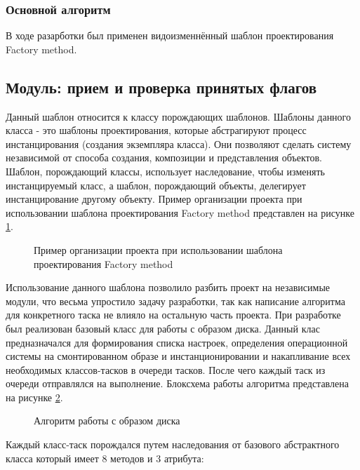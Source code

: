 \subsubsection{Основной алгоритм}
В ходе разарботки был применен видоизменнённый шаблон проектирования Factory method.


\newpage
\subsection{Модуль: прием и проверка принятых флагов} %


Данный шаблон относится к классу порождающих шаблонов. Шаблоны данного класса - это шаблоны проектирования, которые абстрагируют процесс инстанцирования (создания экземпляра класса). Они позволяют сделать систему независимой от способа создания, композиции и представления объектов. Шаблон, порождающий классы, использует наследование, чтобы изменять инстанцируемый класс, а шаблон, порождающий объекты, делегирует инстанцирование другому объекту.
Пример организации проекта при использовании шаблона проектирования Factory method представлен на рисунке \ref{architech:architech}.

\begin{figure}[h!]
\caption{Пример организации проекта при использовании шаблона проектирования Factory method}
\label{architech:architech}
\end{figure}

Использование данного шаблона позволило разбить проект на независимые модули, что весьма упростило задачу разработки, так как написание алгоритма для конкретного таска не влияло на остальную часть проекта. При разработке был реализован базовый класс для работы с образом диска. Данный клас предназначался для формирования списка настроек, определения операционной системы на смонтированном образе и инстанционировании и накапливание всех необходимых классов-тасков в очереди тасков. После чего каждый таск из очереди отправлялся на выполнение. Блоксхема работы алгоритма представлена на рисунке \ref{alg_main:alg_main}.

\begin{figure}[h!]
\caption{Алгоритм работы с образом диска}
\label{alg_main:alg_main}
\end{figure}

Каждый класс-таск порождался путем наследования от базового абстрактного класса который имеет 8 методов и 3 атрибута:

